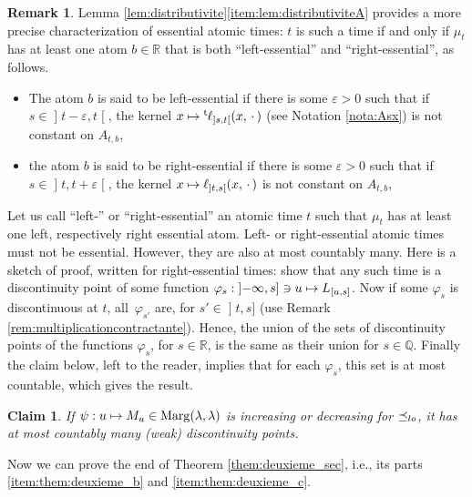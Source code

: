 \documentclass[11pt]{article}
\newcommand{\ie}{i.e.,\xspace}
\newcommand\mto{\mathchoice{\longmapsto}{\mapsto}{\mapsto}{\mapsto}}
\theoremstyle{plain}
\newtheorem*{claim}{Claim}
\theoremstyle{definition}
\newtheorem{rem}[them]{Remark}
\newcommand{\trans}{{}^{\mathrm{t}}\mkern-1mu}
\newcommand{\espcdot}{\mbox{$\,\cdot\,$}}
\let\eps\varepsilon
\newcommand{\la}{\lambda}
\newcommand{\ma}{\mathrm{Marg}}
\newcommand{\R}{\mathbb{R}}
\newcommand{\Q}{\mathbb{Q}}
\newcommand{\op}{\mathopen}
\newcommand{\clo}{\mathclose}
\newcommand{\leqlc}{\preceq_{\rm lo}}
\begin{document}
\begin{rem}\label{rem:essentiel_divers_bis}Lemma \ref{lem:distributivite}\eqref{item:lem:distributiviteA} provides a more precise characterization of essential atomic times: $t$ is such a time if and only if $\mu_t$ has at least one atom $b\in\R$ that is both ``left-essential'' and ``right-essential'', as follows.
\begin{itemize}
\item
The atom $b$ is said to be left-essential if there is some $\eps\!>\!0$ such that if $s\!\in\!\op]t-\eps,t\clo[$, the kernel $x\mto \trans\ell_{\op]s,t\clo[}(x,\espcdot)$ (see Notation \ref{nota:Asx}) is not constant on $A_{t,b}$,

\item
the atom $b$ is said to be right-essential if there is some $\eps\!>\!0$ such that if $s\!\in\!\op]t,t+\eps\clo[$, the kernel $x\mto\ell_{\op]t,s\clo[}(x,\espcdot)$ is not constant on $A_{t,b}$,
\end{itemize}
Let us call ``left-'' or ``right-essential'' an atomic time $t$ such that $\mu_t$ has at least one left, respectively right essential atom. Left- or right-essential atomic times must not be essential. However, they are also at most countably many. Here is a sketch of proof, written for right-essential times: show that any such time is a discontinuity point of some function $\varphi_s:\op]-\infty,s]\ni u\mto L_{[u,s]}$. Now if some $\varphi_s$ is discontinuous at $t$, all~$\varphi_{s'}$ are, for $s'\in\op]t,s]$ (use Remark \ref{rem:multiplicationcontractante}). Hence, the union of the sets of discontinuity points of the functions $\varphi_s$, for $s\in\R$, is the same as their union for $s\in\Q$. Finally the claim below, left to the reader, implies that for each $\varphi_s$, this set is at most countable, which gives the result.

\begin{claim}
If $\psi:u\mto M_u\in \ma(\la,\la)$ is increasing or decreasing for $\leqlc$, it has at most countably many (weak) discontinuity points.
\end{claim}
\end{rem}

Now we can prove the end of Theorem \ref{them:deuxieme_sec}, \ie its parts \eqref{item:them:deuxieme_b} and \eqref{item:them:deuxieme_c}.
\end{document}
